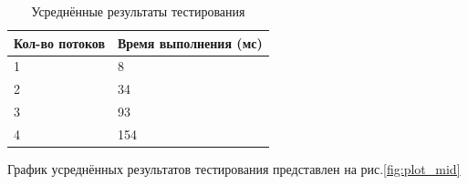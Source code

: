 \begin{table}[H]
    \centering
    \begin{tabular}{|l|l|}
        \hline
        Кол-во потоков & Время выполнения (мс) \\
        \hline
        1 & 8 \\
        \hline
        2 & 34 \\
        \hline
        3 & 93 \\
        \hline
        4 & 154 \\
        \hline
    \end{tabular}
    \caption{Усреднённые результаты тестирования}
    \label{tab:results_mid}
\end{table}
        

График усреднённых результатов тестирования представлен на рис.\ref{fig:plot_mid}

